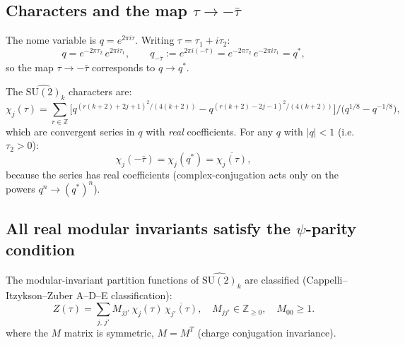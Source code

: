 \documentclass[11pt,a4paper]{article}
\theoremstyle{definition}
\theoremstyle{remark}
\begin{document}
\subsection{Characters and the map \texorpdfstring{$\tau \to -\bar\tau$}{τ→-τ̄}}

The nome variable is $q = e^{2\pi i \tau}$.  Writing $\tau = \tau_1 + i\tau_2$:
\begin{equation}
  q = e^{-2\pi\tau_2}\,e^{2\pi i\tau_1},
  \qquad
  q_{-\bar\tau} := e^{2\pi i(-\bar\tau)}
  = e^{-2\pi\tau_2}\,e^{-2\pi i\tau_1}
  = q^*,
\end{equation}
so the map $\tau \to -\bar\tau$ corresponds to $q \to q^*$.

The $\widehat{\mathrm{SU}(2)}_k$ characters are:
\begin{equation}
  \chi_j(\tau) = \sum_{r \in \mathbb{Z}} \bigl[
    q^{(r(k+2)+2j+1)^2/(4(k+2))} - q^{(r(k+2)-2j-1)^2/(4(k+2))}
  \bigr]
  \Big/
  \bigl(q^{1/8} - q^{-1/8}\bigr),
\end{equation}
which are convergent series in $q$ with \emph{real} coefficients.
For any $q$ with $|q| < 1$ (i.e.\ $\tau_2 > 0$):
\begin{equation}
  \chi_j(-\bar\tau) = \chi_j(q^*) = \overline{\chi_j(\tau)},
  \label{eq:chi_conjug}
\end{equation}
because the series has real coefficients (complex-conjugation acts only
on the powers $q^n \to (q^*)^n$).

\subsection{All real modular invariants satisfy the \texorpdfstring{$\psi$}{psi}-parity condition}

The modular-invariant partition functions of $\widehat{\mathrm{SU}(2)}_k$
are classified (Cappelli–Itzykson–Zuber A–D–E classification):
\begin{equation}
  Z(\tau) = \sum_{j,\,j'} M_{jj'}\,\chi_j(\tau)\,\overline{\chi_{j'}(\tau)},
  \quad M_{jj'} \in \mathbb{Z}_{\geq 0},\quad M_{00} \geq 1.
  \label{eq:Z_general}
\end{equation}
where the $M$ matrix is symmetric, $M = M^T$ (charge conjugation
invariance).
\end{document}
